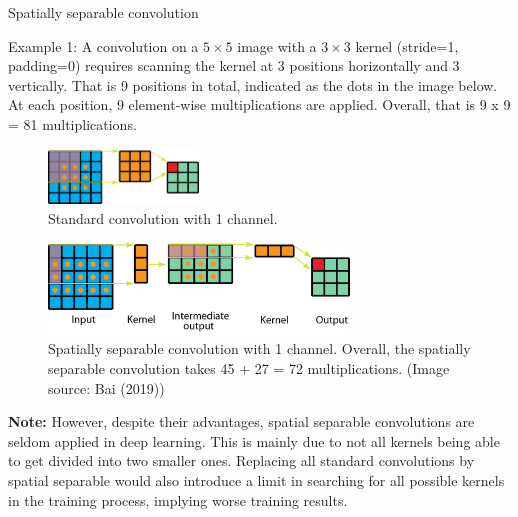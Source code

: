\begin{vbframe}{Spatially separable convolution}
  
  Example 1: A convolution on a $5 \times 5$ image with a $3 \times 3$ kernel (stride=1, padding=0) requires scanning the kernel at 3 positions horizontally and 3 vertically. That is 9 positions in total, indicated as the dots in the image below. At each position, 9 element-wise multiplications are applied. Overall, that is 9 x 9 = 81 multiplications.
     \begin{figure}
         \centering
         \includegraphics[width=4cm]{plots/05_conv_variations/separable/sep0.png}
         \caption{Standard convolution with 1 channel.}
     \end{figure}
   
     \begin{figure}
         \centering
         \includegraphics[width=8cm]{plots/05_conv_variations/separable/sep1.png}
         \caption{Spatially separable convolution with 1 channel. Overall, the spatially separable convolution takes 45 + 27 = 72 multiplications. (Image source: Bai (2019))}
     \end{figure}
     
    

   \textbf{Note:} However, despite their advantages, spatial separable convolutions are seldom applied in deep learning. This is mainly due to not all kernels being able to get divided into two smaller ones. Replacing all standard convolutions by spatial separable would also introduce a limit in searching for all possible kernels in the training process, implying worse training results.
   
\end{vbframe}

